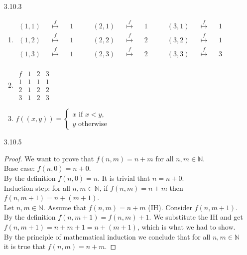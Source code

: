 \begin{itemize}
\begin{enumerate}[(a)]
\end{enumerate}
\item[3.10.3] \
\begin{enumerate}
    \item $	\begin{matrix}
		(1,1) && \overset{f}{\mapsto} && 1 \\ 
		(1,2) && \overset{f}{\mapsto} && 1 \\ 
		(1,3) && \overset{f}{\mapsto} && 1 \\
	\end{matrix} 
	\qquad	
	\begin{matrix}
		(2,1) && \overset{f}{\mapsto} && 1 \\
		(2,2) && \overset{f}{\mapsto} && 2\\
		(2,3) && \overset{f}{\mapsto} && 2\\
	\end{matrix}
	\qquad
		\begin{matrix}
 		(3,1)&& \overset{f}{\mapsto} && 1\\
		(3,2)&& \overset{f}{\mapsto} && 1\\
		(3,3) && \overset{f}{\mapsto} && 3\\
	\end{matrix}$
	\item $\begin{array}{c|ccc}
		f & 1 & 2 & 3 \\ \hline
		1 & 1& 1& 1 \\
		2 & 1 & 2 &2 \\
		3 & 1 & 2 & 3 
	\end{array}$
	\item 	$
	f((x, y)) = 
	\begin{cases}
	x \text{ if } x < y,\\
	y \text{ otherwise}
	\end{cases}
	$
\end{enumerate}{}

\item[3.10.5]
        \begin{proof}
          We want to prove that $f(n,m) = n + m$ for all $n, m \in \mathbb{N}$.\\
          Base case: $f(n,0) = n + 0$.\\
          By the definition $f(n,0) = n$. It is trivial that $n = n + 0$.\\
          Induction step: for all $n, m \in \mathbb{N}$, if $f(n,m) = n +m$ then $f(n,m+1) = n + (m + 1)$.\\
          Let $n, m \in \mathbb{N}$. Assume that $f(n,m) = n + m$ (IH). Consider $f(n, m + 1)$. By the definition $f(n, m +1) = f(n,m) + 1$. We substitute the IH and get $f(n, m +1) = n + m + 1 = n + (m + 1)$, which is what we had to show.\\
          By the principle of mathematical induction we conclude that for all $n, m \in \mathbb{N}$ it is true that $f(n,m) = n + m$.
        \end{proof}


\end{itemize}
